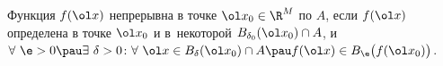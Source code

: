 
	 Функция $f(\ol x)$ непрерывна в точке $\ol x_0\in\R^M$ по $A$, если $f(\ol x)$ определена в точке $\ol x_0$ и в~некоторой
	 $B_{\delta_0}(\ol x_0)\cap A$, и $\forall\ \e>0\pau \exists \ \delta >0\colon 
	 \forall \ \ol x\in B_\delta(\ol x_0)\cap A\pau f(\ol x)\in B_\e\big(f(\ol x_0)\big)$.  
	 